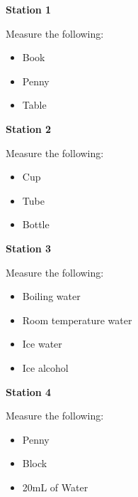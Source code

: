 \documentclass[54pt, fleqn, paper=letter, oneside]{scrartcl}
\begin{document}
\center
\thispagestyle{empty}
\textbf{\LARGE Station 1}

Measure the following:
\begin{itemize}
\item Book
\item Penny
\item Table
\end{itemize}


\newpage
\thispagestyle{empty}

\textbf{\LARGE Station 2}

Measure the following:
\begin{itemize}
\item Cup
\item Tube
\item Bottle
\end{itemize}

\newpage
\thispagestyle{empty}

\textbf{\LARGE Station 3}

Measure the following:
\begin{itemize}
\item Boiling water
\item Room temperature water
\item Ice water
\item Ice alcohol
\end{itemize}

\newpage
\thispagestyle{empty}

\textbf{\LARGE Station 4}

Measure the following:
\begin{itemize}
\item Penny
\item Block
\item 20mL of Water
\end{itemize}
\end{document}
